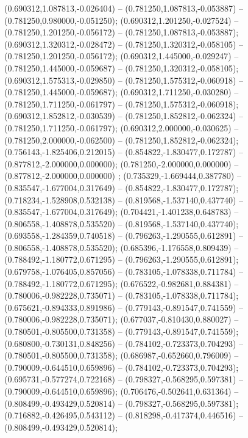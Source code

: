  (0.690312,1.087813,-0.026404) -- (0.781250,1.087813,-0.053887) -- (0.781250,0.980000,-0.051250);
 (0.690312,1.201250,-0.027524) -- (0.781250,1.201250,-0.056172) -- (0.781250,1.087813,-0.053887);
 (0.690312,1.320312,-0.028472) -- (0.781250,1.320312,-0.058105) -- (0.781250,1.201250,-0.056172);
 (0.690312,1.445000,-0.029247) -- (0.781250,1.445000,-0.059687) -- (0.781250,1.320312,-0.058105);
 (0.690312,1.575313,-0.029850) -- (0.781250,1.575312,-0.060918) -- (0.781250,1.445000,-0.059687);
 (0.690312,1.711250,-0.030280) -- (0.781250,1.711250,-0.061797) -- (0.781250,1.575312,-0.060918);
 (0.690312,1.852812,-0.030539) -- (0.781250,1.852812,-0.062324) -- (0.781250,1.711250,-0.061797);
 (0.690312,2.000000,-0.030625) -- (0.781250,2.000000,-0.062500) -- (0.781250,1.852812,-0.062324);
 (0.756143,-1.825406,0.212015) -- (0.854822,-1.830477,0.172787) -- (0.877812,-2.000000,0.000000);
 (0.781250,-2.000000,0.000000) -- (0.877812,-2.000000,0.000000) ;
 (0.735329,-1.669444,0.387780) -- (0.835547,-1.677004,0.317649) -- (0.854822,-1.830477,0.172787);
 (0.718234,-1.528908,0.532138) -- (0.819568,-1.537140,0.437740) -- (0.835547,-1.677004,0.317649);
 (0.704421,-1.401238,0.648783) -- (0.806558,-1.408878,0.535520) -- (0.819568,-1.537140,0.437740);
 (0.693558,-1.284359,0.740518) -- (0.796263,-1.290555,0.612891) -- (0.806558,-1.408878,0.535520);
 (0.685396,-1.176558,0.809439) -- (0.788492,-1.180772,0.671295) -- (0.796263,-1.290555,0.612891);
 (0.679758,-1.076405,0.857056) -- (0.783105,-1.078338,0.711784) -- (0.788492,-1.180772,0.671295);
 (0.676522,-0.982681,0.884381) -- (0.780006,-0.982228,0.735071) -- (0.783105,-1.078338,0.711784);
 (0.675621,-0.894333,0.891986) -- (0.779143,-0.891547,0.741559) -- (0.780006,-0.982228,0.735071);
 (0.677037,-0.810430,0.880027) -- (0.780501,-0.805500,0.731358) -- (0.779143,-0.891547,0.741559);
 (0.680800,-0.730131,0.848256) -- (0.784102,-0.723373,0.704293) -- (0.780501,-0.805500,0.731358);
 (0.686987,-0.652660,0.796009) -- (0.790009,-0.644510,0.659896) -- (0.784102,-0.723373,0.704293);
 (0.695731,-0.577274,0.722168) -- (0.798327,-0.568295,0.597381) -- (0.790009,-0.644510,0.659896);
 (0.706476,-0.502641,0.631364) -- (0.808499,-0.493429,0.520814) -- (0.798327,-0.568295,0.597381);
 (0.716882,-0.426495,0.543112) -- (0.818298,-0.417374,0.446516) -- (0.808499,-0.493429,0.520814);
